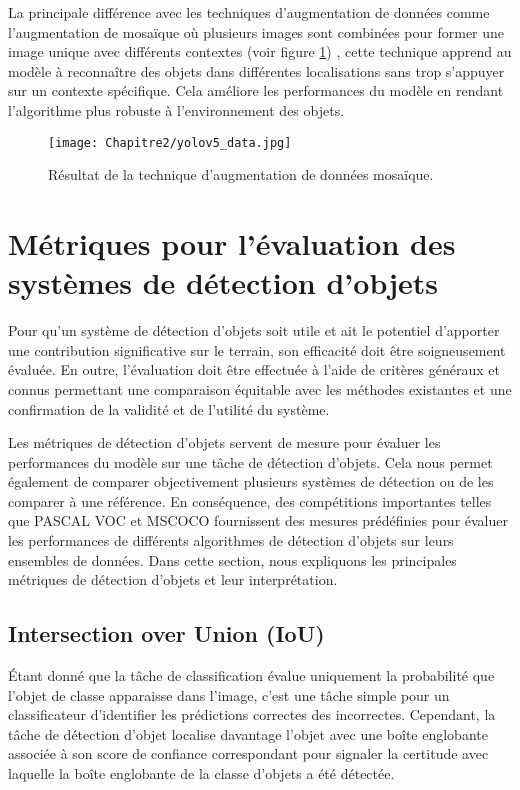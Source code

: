 La principale différence avec les techniques d'augmentation de données comme l'augmentation de mosaïque où plusieurs images sont combinées pour former une image unique avec différents contextes (voir figure \ref{yolov5_mosa}) , cette technique apprend au modèle à reconnaître des objets dans différentes localisations sans trop s'appuyer sur un contexte spécifique. Cela améliore les performances du modèle en rendant l'algorithme plus robuste à l'environnement des objets.

\begin{figure}[H]
          \centering
          \texttt{[image: Chapitre2/yolov5\_data.jpg]}
          \caption{Résultat de la technique d'augmentation de données mosaïque.}
          \label{yolov5_mosa}
          \end{figure}

\section{Métriques pour l'évaluation des systèmes de détection d'objets} 
Pour qu'un système de détection d'objets soit utile et ait le potentiel d'apporter une contribution significative sur le terrain, son efficacité doit être soigneusement évaluée. En outre, l'évaluation doit être effectuée à l'aide de critères généraux et connus permettant une comparaison équitable avec les méthodes existantes et une confirmation de la validité et de l'utilité du système.

Les métriques de détection d'objets servent de mesure pour évaluer les performances du modèle sur une tâche de détection d'objets. Cela nous permet également de comparer objectivement plusieurs systèmes de détection ou de les comparer à une référence. En conséquence, des compétitions importantes telles que PASCAL VOC et MSCOCO fournissent des mesures prédéfinies pour évaluer les performances de différents algorithmes de détection d'objets sur leurs ensembles de données. Dans cette section, nous expliquons les principales métriques de détection d'objets et leur interprétation.
\subsection{Intersection over Union (IoU)}
Étant donné que la tâche de classification évalue uniquement la probabilité que l'objet de classe apparaisse dans l'image, c'est une tâche simple pour un classificateur d'identifier les prédictions correctes des incorrectes. Cependant, la tâche de détection d'objet localise davantage l'objet avec une boîte englobante associée à son score de confiance correspondant pour signaler la certitude avec laquelle la boîte englobante de la classe d'objets a été détectée.

